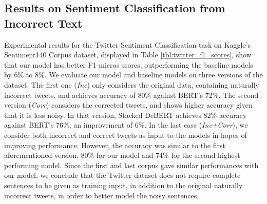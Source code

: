 \documentclass[review]{elsarticle}
\begin{document}
\subsection{Results on Sentiment Classification from Incorrect Text} \label{sec:results_twitter}
Experimental results for the Twitter Sentiment Classification task on Kaggle's Sentiment140 Corpus dataset, displayed in Table \ref{tbl:twitter_f1_scores}, show that our model has better F1-micros scores, outperforming the baseline models by 6$\%$ to 8$\%$. We evaluate our model and baseline models on three versions of the dataset. The first one (\textit{Inc}) only considers the original data, containing naturally incorrect tweets, and achieves accuracy of 80$\%$ against BERT's 72$\%$. The second version (\textit{Corr}) considers the corrected tweets, and shows higher accuracy given that it is less noisy. In that version, Stacked DeBERT achieves 82$\%$ accuracy against BERT's 76$\%$, an improvement of 6$\%$. In the last case (\textit{Inc+Corr}), we consider both incorrect and correct tweets as input to the models in hopes of improving performance. However, the accuracy was similar to the first aforementioned version, 80$\%$ for our model and 74$\%$ for the second highest performing model. Since the first and last corpus gave similar performances with our model, we conclude that the Twitter dataset does not require complete sentences to be given as training input, in addition to the original naturally incorrect tweets, in order to better model the noisy sentences.

\begin{table}[ht!]
  \caption{F1-micro scores for the Twitter Sentiment Classification task on Kaggle's Sentiment140 Corpus. Note that: (\textit{Inc}) is the original dataset, with naturally incorrect tweets, (\textit{Corr}) is the corrected version of the dataset and (\textit{Inc+Corr}) contains both. The noise level is represented by the iBLEU score.}
  \label{tbl:twitter_f1_scores}
  \bigskip
  \centering
\end{table}
\end{document}
